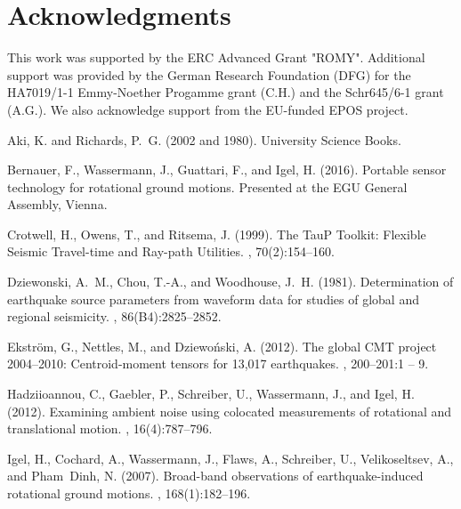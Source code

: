 \documentclass[12pt,reqno,letter]{article}
\begin{document}
\section*{Acknowledgments}
This work was supported by the ERC Advanced Grant "ROMY". Additional support was provided by the German Research Foundation (DFG) for the HA7019/1-1 Emmy-Noether Progamme grant (C.H.) and the Schr645/6-1 grant (A.G.). We also acknowledge support from the EU-funded EPOS project. 


\label{Bibliography}
\begin{thebibliography}{}

{Aki}, K. and {Richards}, P.~G. (2002 and 1980).
\newblock University Science Books.

Bernauer, F., Wassermann, J., Guattari, F., and Igel, H. (2016).
\newblock Portable sensor technology for rotational ground motions.
\newblock Presented at the EGU General Assembly, Vienna.

Crotwell, H., Owens, T., and Ritsema, J. (1999).
\newblock The TauP Toolkit: Flexible Seismic Travel-time and Ray-path Utilities.
, 70(2):154--160.

Dziewonski, A.~M., Chou, T.-A., and Woodhouse, J.~H. (1981).
\newblock Determination of earthquake source parameters from waveform data for
  studies of global and regional seismicity.
,
  86(B4):2825--2852.

Ekstr{\"o}m, G., Nettles, M., and Dziewo\'{n}ski, A. (2012).
\newblock The global {CMT} project 2004–2010: Centroid-moment tensors for
  13,017 earthquakes.
, 200–201:1 -- 9.

Hadziioannou, C., Gaebler, P., Schreiber, U., Wassermann, J., and Igel, H.
  (2012).
\newblock Examining ambient noise using colocated measurements of rotational
  and translational motion.
, 16(4):787--796.

Igel, H., Cochard, A., Wassermann, J., Flaws, A., Schreiber, U., Velikoseltsev,
  A., and Pham~Dinh, N. (2007).
\newblock Broad-band observations of earthquake-induced rotational ground
  motions.
, 168(1):182--196.


\end{thebibliography}
\end{document}
